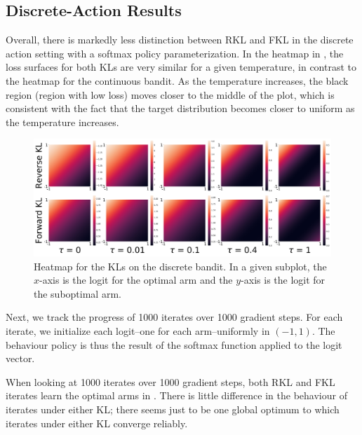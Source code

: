 \documentclass[twoside,11pt]{article}
\begin{document}
 
\subsection{Discrete-Action Results}\label{sec:microworld-discrete-actions}

Overall, there is markedly less distinction between RKL and FKL in the discrete action setting with a softmax policy parameterization. In the heatmap in , the loss surfaces for both KLs are very similar for a given temperature, in contrast to the heatmap for the continuous bandit. As the temperature increases, the black region (region with low loss) moves closer to the middle of the plot, which is consistent with the fact that the target distribution becomes closer to uniform as the temperature increases. 

\begin{figure}[!htb]
    \centering
    \includegraphics[width=1\columnwidth]{figs/discrete-bandit/heatmaps/discrete.png}
    \caption{Heatmap for the KLs on the discrete bandit. In a given subplot, the $x$-axis is the logit for the optimal arm and the $y$-axis is the logit for the suboptimal arm.}
    \label{fig:discrete-heatmap}
  \end{figure}

Next, we track the progress of 1000 iterates over 1000 gradient steps. For each iterate, we initialize each logit--one for each arm--uniformly in $(-1, 1)$. The behaviour policy is thus the result of the softmax function applied to the logit vector. 

When looking at 1000 iterates over 1000 gradient steps, both RKL and FKL iterates learn the optimal arms in . There is little difference in the behaviour of iterates under either KL; there seems just to be one global optimum to which iterates under either KL converge reliably. 

  
\end{document}
